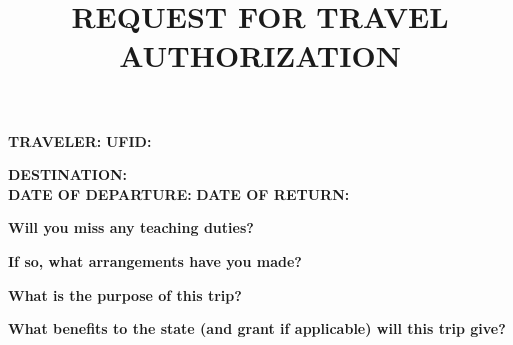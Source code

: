 \documentclass[•]{article}
\title{\textbf{REQUEST FOR TRAVEL AUTHORIZATION}}
\newif\ifAutomate
\newcommand{\mileageReimburse}{%
0.445
}
\newcommand{\expenseTotal}{}
\newcommand{\mileage}{}
\newcommand{\mealTotal}{}
\newcommand{\expenseAirfare}{}
\newcommand{\expenseMealsCalc}{}
\newcommand{\expenseRegistration}{}
\newcommand{\expenseLodging}{}
\newcommand{\expenseCar}{}
\newcommand{\expenseIncidental}{}
\newcommand{\expenseTaxi}{}
\newcommand{\expenseOtherOne}{}
\newcommand{\expenseOtherTwo}{}
\newcommand{\expenseOtherThree}{}
\newcommand{\travelor}{%
    \hfill%
}
\newcommand{\UFID}{%
    \hfill \hspace*{1pt}%
}
\newcommand{\travelLoc}{
Atlanta Georgia%
}
\newcommand{\leaveTime}{%
    \hfill %
}
\newcommand{\returnTime}{%
    \hfill \hspace*{1pt}%
}
\newcommand{\missTeaching}{%
No %
}
\newcommand{\missTeachingArrangements}{%
None %
}
\newcommand{\purpose}{%
Attend and participate in the SouthEastern Analysis Meeting.%
}
\newcommand{\benefit}{%
Discuss and disseminate recent results in operator theory %
}
\newcommand{\expenseAirfare}{%
0
}
\newcommand{\expenseRegistration}{%
40
}
\newcommand{\expenseLodging}{%
300
}
\newcommand{\expenseCar}{%
0
}
\newcommand{\expenseMileage}{%
0
}
\newcommand{\expenseIncidental}{%
0
}
\newcommand{\expenseTaxi}{%
50
}
\newcommand{\expenseOtherOne}{%
0
}
\newcommand{\expenseOtherTwo}{%
0
}
\newcommand{\expenseOtherThree}{%
0
}
\newcommand{\expenseMeals}{%
0
}
\newcommand{\expenseMealsCalc}{%

\newcommand{\daysGone}{%
2
}
\newcommand{\hourLeave}{%
12
}
\newcommand{\hourReturn}{%
18
}







\FPeval\hrL{clip(trunc((\hourLeave - 0.0000001):0) + 1)}
\FPeval\hrR{clip(trunc((\hourReturn + 0.0000001):0) - 1)}



\expandafter\ifnum\hourLeave < 7
\FPeval\hrLTMP{6}
\else
\FPeval\hrLTMP{0}
\fi

\expandafter\ifnum\hourLeave < 13
\FPeval\hrLTMP{\hrLTMP + 11}
\fi

\expandafter\ifnum\hourLeave < 21
\FPeval\hrLTMP{\hrLTMP + 19}
\fi

\expandafter\ifnum\hourReturn > 5
\FPeval\hrRTMP{6}
\else
\FPeval\hrRTMP{0}
\fi

\expandafter\ifnum\hourReturn > 11
\FPeval\hrRTMP{\hrRTMP + 11}
\fi

\expandafter\ifnum\hourReturn > 19
\FPeval\hrRTMP{\hrRTMP + 19}
\fi


\FPeval\mealTotal{round((\hrRTMP + \hrLTMP + 36*\daysGone):2)}

\FPeval\mealTotal{max(\mealTotal,\expenseMeals)}


\FPeval\mileage{clip(\expenseMileage * \mileageReimburse)}

\FPeval\expenseTotal{round((\expenseAirfare + \expenseRegistration + \expenseLodging + \mealTotal + \expenseCar + \mileage + \expenseIncidental + \expenseTaxi + \expenseOtherOne + \expenseOtherTwo + \expenseOtherThree):2)}
}
\begin{document}
\date{}
\maketitle
\vspace{-1.5cm}

\expenseMealsCalc

\textbf{TRAVELER:} \ifAutomate\travelor\else\hfill\fi \textbf{UFID:} \ifAutomate\UFID\else\hfill\hspace*{1pt}\fi

\textbf{DESTINATION:} \ifAutomate\travelLoc\fi \\

\textbf{DATE OF DEPARTURE: }\ifAutomate\leaveTime\else\hfill\fi \textbf{DATE OF RETURN: }\ifAutomate\returnTime\else\hfill\hspace*{1pt}\fi

\textbf{Will you miss any teaching duties?} \ifAutomate\missTeaching\fi

\textbf{If so, what arrangements have you made?} \ifAutomate\missTeachingArrangements\fi

\textbf{What is the purpose of this trip?}  \ifAutomate\purpose\else\vfill\fi

\textbf{What benefits to the state (and grant if applicable) will this trip give?} \ifAutomate\benefit\else\vfill\fi

\hrulefill
\end{document}

